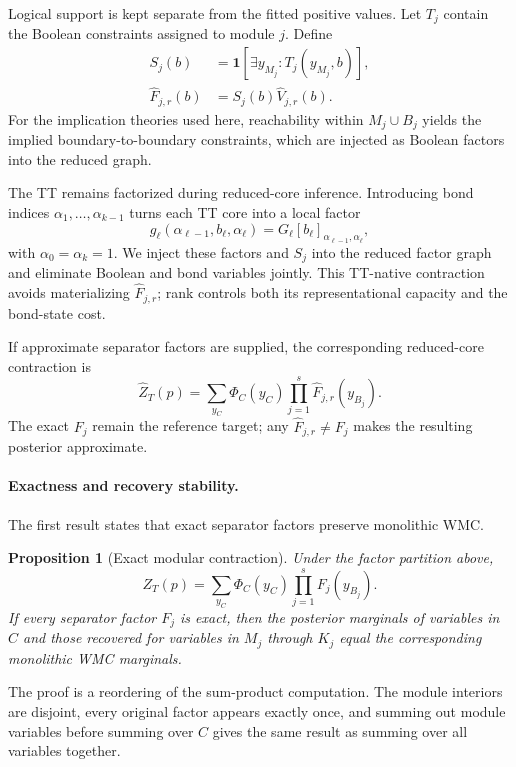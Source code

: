 \documentclass[letterpaper]{article}
\newtheorem{proposition}{Proposition}
\begin{document}
Logical support is kept separate from the fitted positive values. Let
\(T_j\) contain the Boolean constraints assigned to module \(j\). Define
\begin{align*}
S_j(b)
&=\mathbf{1}\!\left[
\exists y_{M_j}:T_j(y_{M_j},b)
\right],\\
\widehat F_{j,r}(b)
&=S_j(b)\widehat V_{j,r}(b).
\end{align*}
For the implication theories used here, reachability within \(M_j\cup B_j\)
yields the implied boundary-to-boundary constraints, which are injected as
Boolean factors into the reduced graph.

The TT remains factorized during reduced-core inference. Introducing bond
indices \(\alpha_1,\ldots,\alpha_{k-1}\) turns each TT core into a local
factor
\[
g_\ell(\alpha_{\ell-1},b_\ell,\alpha_\ell)
=G_\ell[b_\ell]_{\alpha_{\ell-1},\alpha_\ell},
\]
with \(\alpha_0=\alpha_k=1\). We inject these factors and \(S_j\) into the
reduced factor graph and eliminate Boolean and bond variables jointly.
This TT-native contraction avoids materializing \(\widehat F_{j,r}\);
rank controls both its representational capacity and the bond-state cost.

If approximate separator factors are supplied, the corresponding
reduced-core contraction is
\[
\widehat{Z}_T(p)
=
\sum_{y_C}
\Phi_C(y_C)
\prod_{j=1}^{s}
\widehat{F}_{j,r}(y_{B_j}).
\]
The exact \(F_j\) remain the reference target; any
\(\widehat F_{j,r}\ne F_j\) makes the resulting posterior approximate.

\paragraph{Exactness and recovery stability.}
The first result states that exact separator factors preserve monolithic
WMC.

\begin{proposition}[Exact modular contraction]
\label{prop:exact-modular}
Under the factor partition above,
\[
Z_T(p)
=
\sum_{y_C}
\Phi_C(y_C)
\prod_{j=1}^{s}
F_j(y_{B_j}).
\]
If every separator factor \(F_j\) is exact, then the posterior marginals
of variables in \(C\) and those recovered for variables in \(M_j\)
through \(K_j\) equal the corresponding monolithic WMC marginals.
\end{proposition}

The proof is a reordering of the sum-product computation. The module
interiors are disjoint, every original factor appears exactly once, and
summing out module variables before summing over \(C\) gives the same
result as summing over all variables together.
\end{document}
